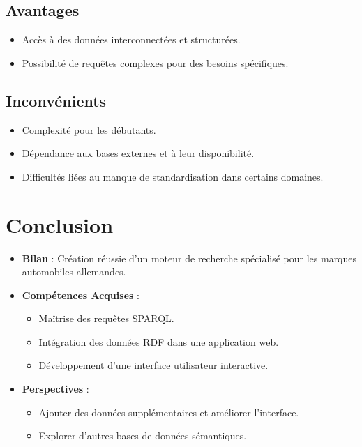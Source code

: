 \documentclass[a4paper]{article}
\begin{document}
\subsection{Avantages}
\begin{itemize}
    \item Accès à des données interconnectées et structurées.
    \item Possibilité de requêtes complexes pour des besoins spécifiques.
\end{itemize}

\subsection{Inconvénients}
\begin{itemize}
    \item Complexité pour les débutants.
    \item Dépendance aux bases externes et à leur disponibilité.
    \item Difficultés liées au manque de standardisation dans certains domaines.
\end{itemize}

\newpage

\section{Conclusion}
\begin{itemize}
    \item \textbf{Bilan} : Création réussie d'un moteur de recherche spécialisé pour les marques automobiles allemandes.
    \item \textbf{Compétences Acquises} :
    \begin{itemize}
        \item Maîtrise des requêtes SPARQL.
        \item Intégration des données RDF dans une application web.
        \item Développement d'une interface utilisateur interactive.
    \end{itemize}
    \item \textbf{Perspectives} :
    \begin{itemize}
        \item Ajouter des données supplémentaires et améliorer l'interface.
        \item Explorer d'autres bases de données sémantiques.
    \end{itemize}
\end{itemize}

\newpage
\end{document}
